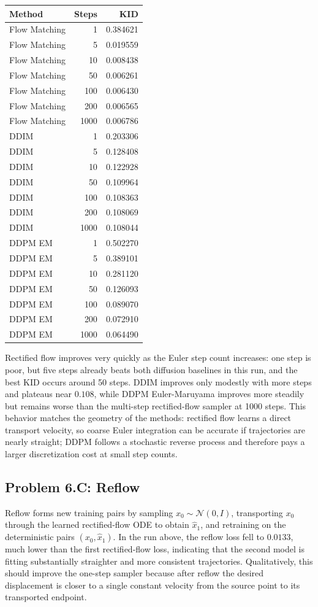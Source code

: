 \documentclass[11pt]{article}
\newcommand{\N}{\mathcal{N}}
\begin{document}
\begin{center}
\begin{tabular}{lrr}
\toprule
Method & Steps & KID \\
\midrule
Flow Matching & 1 & 0.384621 \\
Flow Matching & 5 & 0.019559 \\
Flow Matching & 10 & 0.008438 \\
Flow Matching & 50 & 0.006261 \\
Flow Matching & 100 & 0.006430 \\
Flow Matching & 200 & 0.006565 \\
Flow Matching & 1000 & 0.006786 \\
DDIM & 1 & 0.203306 \\
DDIM & 5 & 0.128408 \\
DDIM & 10 & 0.122928 \\
DDIM & 50 & 0.109964 \\
DDIM & 100 & 0.108363 \\
DDIM & 200 & 0.108069 \\
DDIM & 1000 & 0.108044 \\
DDPM EM & 1 & 0.502270 \\
DDPM EM & 5 & 0.389101 \\
DDPM EM & 10 & 0.281120 \\
DDPM EM & 50 & 0.126093 \\
DDPM EM & 100 & 0.089070 \\
DDPM EM & 200 & 0.072910 \\
DDPM EM & 1000 & 0.064490 \\
\bottomrule
\end{tabular}
\end{center}

Rectified flow improves very quickly as the Euler step count increases: one step is poor, but five steps already beats both diffusion baselines in this run, and the best KID occurs around 50 steps.  DDIM improves only modestly with more steps and plateaus near $0.108$, while DDPM Euler-Maruyama improves more steadily but remains worse than the multi-step rectified-flow sampler at 1000 steps.  This behavior matches the geometry of the methods: rectified flow learns a direct transport velocity, so coarse Euler integration can be accurate if trajectories are nearly straight; DDPM follows a stochastic reverse process and therefore pays a larger discretization cost at small step counts.

\subsection*{Problem 6.C: Reflow}
Reflow forms new training pairs by sampling $x_0\sim\N(0,I)$, transporting $x_0$ through the learned rectified-flow ODE to obtain $\hat x_1$, and retraining on the deterministic pairs $(x_0,\hat x_1)$.  In the run above, the reflow loss fell to $0.0133$, much lower than the first rectified-flow loss, indicating that the second model is fitting substantially straighter and more consistent trajectories.  Qualitatively, this should improve the one-step sampler because after reflow the desired displacement is closer to a single constant velocity from the source point to its transported endpoint.
\end{document}
